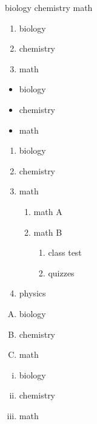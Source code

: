 \documentclass[11pt]{article}
\begin{document}
biology
chemistry
math

\vspace{1cm}

\begin{enumerate}
\item biology
\item chemistry
\item math
\end{enumerate}

\vspace{1cm}

\begin{itemize}
\item biology
\item chemistry
\item math
\end{itemize}

\vspace{1cm}


\begin{enumerate}
\item biology
\item chemistry
\item math
	\begin{enumerate}
	\item math A
	\item math B
		\begin{enumerate}
		\item class test
		\item quizzes
		\end{enumerate}
	\end{enumerate}
\item physics	
\end{enumerate}

\vspace{1cm}

\begin{enumerate}[A.]
\item biology
\item chemistry
\item math	
\end{enumerate}

\vspace{1cm}

\begin{enumerate}[i.]
\item biology
\item chemistry
\item math	
\end{enumerate}
\end{document}

